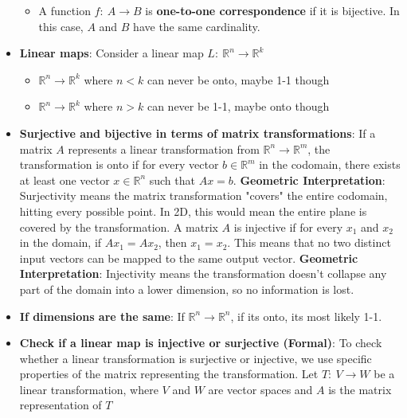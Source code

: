 \documentclass{report}
\begin{document}
\begin{itemize}
\begin{itemize}
                \item A function $f:\ A \to B$ is \textbf{one-to-one correspondence} if it is bijective.  
                    In this case, $A$ and $B$ have the same cardinality.
            \end{itemize}
        \item \textbf{Linear maps}: Consider a linear map $L:\ \mathbb{R}^{n} \to \mathbb{R}^{k}$
            \begin{itemize}
                \item $\mathbb{R}^{n} \to \mathbb{R}^{k}$ where $n < k$ can never be onto, maybe 1-1 though
                \item $\mathbb{R}^{n} \to \mathbb{R}^{k}$ where $n > k$ can never be 1-1, maybe onto though
            \end{itemize}
        \item \textbf{Surjective and bijective in terms of matrix transformations}:
            \bigbreak \noindent 
            If a matrix $A$ represents a linear transformation from $\mathbb{R}^n \to \mathbb{R}^m$, the transformation is onto if for every vector $b \in \mathbb{R}^m$ in the codomain, there exists at least one vector $x \in \mathbb{R}^n$ such that $Ax = b$.
            \bigbreak \noindent 
            \textbf{Geometric Interpretation}: Surjectivity means the matrix transformation "covers" the entire codomain, hitting every possible point. In 2D, this would mean the entire plane is covered by the transformation.
            \bigbreak \noindent 
            A matrix $A$ is injective if for every $x_1$ and $x_2$ in the domain, if $Ax_1 = Ax_2$, then $x_1 = x_2$. This means that no two distinct input vectors can be mapped to the same output vector.
            \bigbreak \noindent 
            \textbf{Geometric Interpretation}: Injectivity means the transformation doesn’t collapse any part of the domain into a lower dimension, so no information is lost.
        \item \textbf{If dimensions are the same}: If $\mathbb{R}^{n} \to \mathbb{R}^{n}$, if its onto, its most likely 1-1.
        \item \textbf{Check if a linear map is injective or surjective (Formal)}: To check whether a linear transformation is surjective or injective, we use specific properties of the matrix representing the transformation.
            \bigbreak \noindent 
            Let $T:\ V \to W$ be a linear transformation, where $V$ and $W$ are vector spaces and $A$ is the matrix representation of $T$
            \begin{itemize}

\end{itemize}
\end{itemize}
\end{document}
